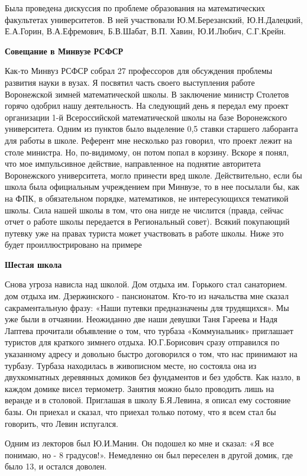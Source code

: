Была проведена дискуссия по проблеме образования на математических факультетах университетов. В ней участвовали Ю.М.Березанский, Ю.Н.Далецкий, Е.А.Горин, В.А.Ефремович, Б.В.Шабат, В.П. Хавин, Ю.И.Любич, С.Г.Крейн.

{\bf Совещание в Минвузе РСФСР}

Как-то Минвуз РСФСР собрал 27 профессоров для обсуждения проблемы развития науки в вузах. Я посвятил часть своего выступления работе Воронежской зимней математической школы. В заключение министр Столетов горячо одобрил нашу деятельность. На следующий день я передал ему проект организации 1-й Всероссийской математической школы на базе Воронежского университета. Одним из пунктов было выделение 0,5 ставки старшего лаборанта для работы в школе. Референт мне несколько раз говорил, что проект лежит на столе министра. Но, по-видимому, он потом попал в корзину. Вскоре я понял, что мое импульсивное действие, направленное на поднятие авторитета Воронежского университета, могло принести вред школе. Действительно, если бы школа была официальным учреждением при Минвузе, то в нее посылали бы, как на ФПК, в обязательном порядке, математиков, не интересующихся тематикой школы. Сила нашей школы в том, что она нигде не числится (правда, сейчас отчет о работе школы передается в Региональный совет). Всякий покупающий путевку уже на правах туриста может участвовать в работе школы. Ниже это будет проиллюстрировано на примере

{\bf Шестая школа}

Снова угроза нависла над школой. Дом отдыха им. Горького стал санаторием. дом отдыха им. Дзержинского - пансионатом. Кто-то из начальства мне сказал сакраментальную фразу: «Наши путевки предназначены для трудящихся». Мы уже были в отчаянии. Неожиданно две наши девушки Таня Гареева и Надя Лаптева прочитали объявление о том, что турбаза «Коммунальник» приглашает туристов для краткого зимнего отдыха. Ю.Г.Борисович сразу отправился по указанному адресу и довольно быстро договорился о том, что нас принимают на турбазу. Турбаза находилась в живописном месте, но состояла она из двухкомнатных деревянных домиков без фундаментов и без удобств. Как назло, в каждом домике висел термометр. Занятия можно было проводить лишь на веранде и в столовой. Приглашая в школу Б.Я.Левина, я описал ему состояние базы. Он приехал и сказал, что приехал только потому, что я всем стал бы говорить, что Левин испугался.

Одним из лекторов был Ю.И.Манин. Он подошел ко мне и сказал: «Я все понимаю, но - 8 градусов!». Немедленно он был переселен в другой домик, где было 13, и остался доволен.


